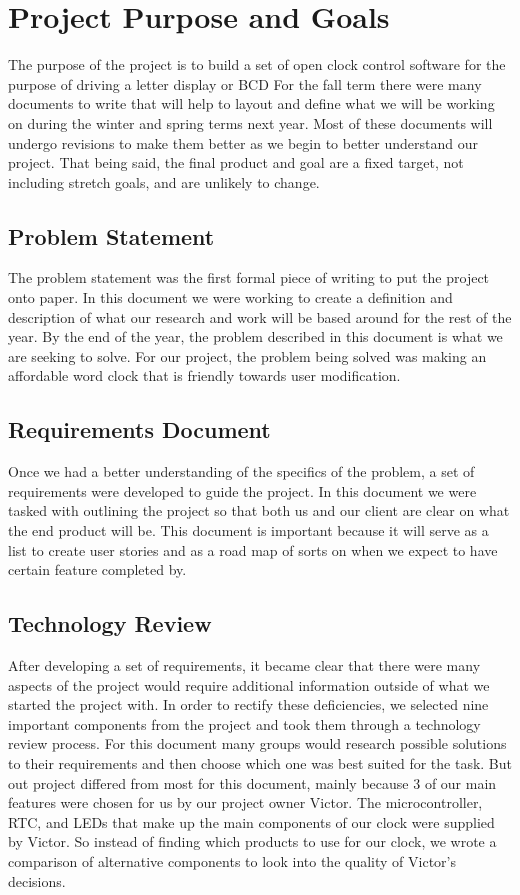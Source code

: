 \documentclass[onecolumn, draftclsnofoot,10pt, compsoc]{IEEEtran}
\begin{document}
\section{Project Purpose and Goals}
The purpose of the project is to build a set of open clock control software for the purpose of driving a letter display or BCD
For the fall term there were many documents to write that will help to layout and define what we will be working on during the winter and spring terms next year.
Most of these documents will undergo revisions to make them better as we begin to better understand our project.
That being said, the final product and goal are a fixed target, not including stretch goals, and are unlikely to change.
\subsection{Problem Statement}
The problem statement was the first formal piece of writing to put the project onto paper.
In this document we were working to create a definition and description of what our research and work will be based around for the rest of the year.
By the end of the year, the problem described in this document is what we are seeking to solve.
For our project, the problem being solved was making an affordable word clock that is friendly towards user modification.
\subsection{Requirements Document}
Once we had a better understanding of the specifics of the problem, a set of requirements were developed to guide the project.
In this document we were tasked with outlining the project so that both us and our client are clear on what the end product will be.
This document is important because it will serve as a list to create user stories and as a road map of sorts on when we expect to have certain feature completed by.
\subsection{Technology Review}
After developing a set of requirements, it became clear that there were many aspects of the project would require additional information outside of what we started the project with.
In order to rectify these deficiencies, we selected nine important components from the project and took them through a technology review process.
For this document many groups would research possible solutions to their requirements and then choose which one was best suited for the task.
But out project differed from most for this document, mainly because 3 of our main features were chosen for us by our project owner Victor.
The microcontroller, RTC, and LEDs that make up the main components of our clock were supplied by Victor.
So instead of finding which products to use for our clock, we wrote a comparison of alternative components to look into the quality of Victor's decisions.
\end{document}
